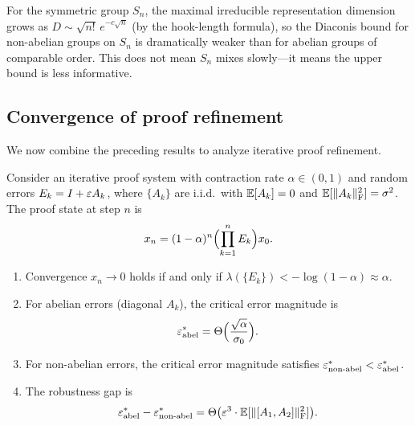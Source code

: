 \begin{example}\label{ex:diaconis}
For the symmetric group $S_n$, the maximal irreducible representation
dimension grows as $D \sim \sqrt{n!}\, e^{-c\sqrt{n}}$ (by the
hook-length formula), so the Diaconis bound for non-abelian groups
on $S_n$ is dramatically weaker than for abelian groups of comparable
order.  This does not mean $S_n$ mixes slowly---it means the upper
bound is less informative.
\end{example}

\subsection{Convergence of proof refinement}

We now combine the preceding results to analyze iterative proof
refinement.

\begin{theorem}\label{thm:convergence}
Consider an iterative proof system with contraction rate $\alpha \in (0,1)$
and random errors $E_k = I + \varepsilon A_k$, where $\{A_k\}$ are i.i.d.\
with $\mathbb{E}[A_k] = 0$ and $\mathbb{E}[\lVert A_k \rVert_{\mathrm{F}}^2] = \sigma^2$.  The proof
state at step $n$ is
\begin{equation}\label{eq:proof_state}
  x_n = (1 - \alpha)^n \Bigl(\prod_{k=1}^n E_k\Bigr) x_0.
\end{equation}
\begin{enumerate}[label=\textup{(\alph*)}]
\item Convergence $x_n \to 0$ holds if and only if
  $\lambda(\{E_k\}) < -\log(1-\alpha) \approx \alpha$.

\item For abelian errors (diagonal $A_k$), the critical error magnitude
  is
  \begin{equation}\label{eq:eps_abel}
    \varepsilon^*_{\mathrm{abel}} = \Theta\Bigl(\frac{\sqrt{\alpha}}{\sigma_0}\Bigr).
  \end{equation}

\item For non-abelian errors, the critical error magnitude satisfies
  $\varepsilon^*_{\mathrm{non\text{-}abel}} < \varepsilon^*_{\mathrm{abel}}$.

\item The robustness gap is
  \begin{equation}\label{eq:robustness_gap}
    \varepsilon^*_{\mathrm{abel}} - \varepsilon^*_{\mathrm{non\text{-}abel}}
    = \Theta\bigl(\varepsilon^3 \cdot \mathbb{E}[\lVert [A_1, A_2] \rVert_{\mathrm{F}}^2]\bigr).
  \end{equation}
\end{enumerate}
\end{theorem}

